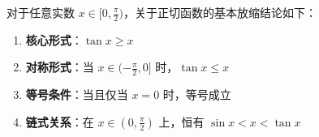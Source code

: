 \begin{statementbox}
对于任意实数 $x \in [0, \frac{\pi}{2})$，关于正切函数的基本放缩结论如下：
\begin{enumerate}
    \item \textbf{核心形式}：$\tan x \geqslant x$
    \item \textbf{对称形式}：当 $x \in (-\frac{\pi}{2}, 0]$ 时，$\tan x \leqslant x$
    \item \textbf{等号条件}：当且仅当 $x = 0$ 时，等号成立
    \item \textbf{链式关系}：在 $x \in (0, \frac{\pi}{2})$ 上，恒有 $\sin x < x < \tan x$
\end{enumerate}
\end{statementbox}